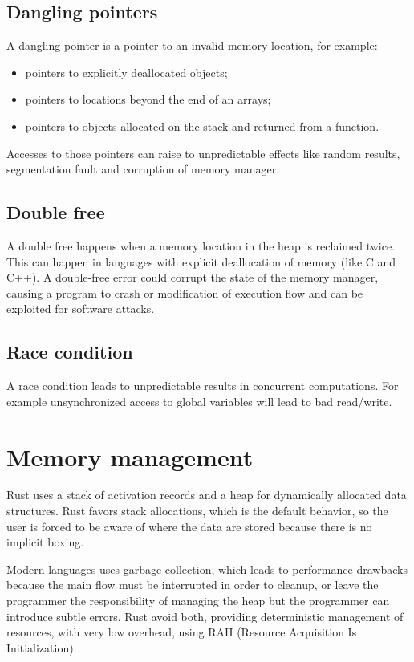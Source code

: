 \subsection{Dangling pointers}
A dangling pointer is a pointer to an invalid memory location, for example:
\begin{itemize}
    \item pointers to explicitly deallocated objects;
    \item pointers to locations beyond the end of an arrays;
    \item pointers to objects allocated on the stack and returned from a function.
\end{itemize}
Accesses to those pointers can raise to unpredictable effects like random results, segmentation fault and corruption of memory manager.

\subsection{Double free}
A double free happens when a memory location in the heap is reclaimed twice.
This can happen in languages with explicit deallocation of memory (like C and C++).
A double-free error could corrupt the state of the memory manager, causing a program to crash or modification of execution flow and can be exploited for software attacks.

\subsection{Race condition}
A race condition leads to unpredictable results in concurrent computations.
For example unsynchronized access to global variables will lead to bad read/write.

\section{Memory management}
Rust uses a stack of activation records and a heap for dynamically allocated data structures.
Rust favors stack allocations, which is the default behavior, so the user is forced to be aware of where the data are stored because there is no implicit boxing.

Modern languages uses garbage collection, which leads to performance drawbacks because the main flow must be interrupted in order to cleanup, or leave the programmer the responsibility of managing the heap but the programmer can introduce subtle errors.
Rust avoid both, providing deterministic management of resources, with very low overhead, using RAII (Resource Acquisition Is Initialization).

